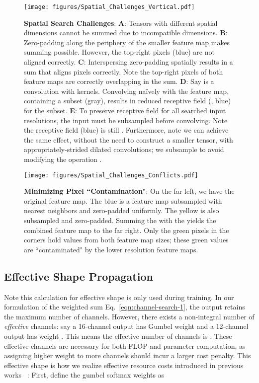 \documentclass[10pt,twocolumn,letterpaper]{article}
\begin{document}
\begin{figure}
    \centering
    \texttt{[image: figures/Spatial\_Challenges\_Vertical.pdf]}
    \caption{\textbf{Spatial Search Challenges}: \textbf{A}: Tensors with different spatial dimensions cannot be summed due to incompatible dimensions. \textbf{B}: Zero-padding along the periphery of the smaller feature map makes summing possible. However, the top-right pixels (blue) are not aligned correctly. \textbf{C}: Interspersing zero-padding spatially results in a sum that aligns pixels correctly. Note the top-right pixels of both feature maps are correctly overlapping in the sum. \textbf{D}: Say  is a convolution with  kernels. Convolving naïvely with the feature map, containing a subset (gray), results in reduced receptive field (, blue) for the subset. \textbf{E}: To preserve receptive field for all searched input resolutions, the input must be subsampled before convolving. Note the receptive field (blue) is still . Furthermore, note we can achieve the same effect, without the need to construct a smaller tensor, with appropriately-strided dilated convolutions; we subsample to avoid modifying the operation .}
    \label{fig:spatial_challenges}
\end{figure}

\begin{figure}
    \centering
    \texttt{[image: figures/Spatial\_Challenges\_Conflicts.pdf]}
    \caption{\textbf{Minimizing Pixel ``Contamination"}: On the far left, we have the original  feature map. The blue  is a feature map subsampled with nearest neighbors and zero-padded uniformly. The yellow  is also subsampled and zero-padded. Summing the  with the  yields the combined feature map to the far right. Only the green pixels in the corners hold values from both feature map sizes; these green values are ``contaminated" by the lower resolution feature maps.}
    \label{fig:spatial_challenges_conflicts}
\end{figure}

\subsection{Effective Shape Propagation}

Note this calculation for effective shape is only used during training. In our formulation of the weighted sum Eq.~\ref{eqn:channel-search-1}, the output  retains the maximum number of channels. However, there exists a non-integral number of \textit{effective} channels: say a 16-channel output has Gumbel weight  and a 12-channel output has weight . This means the effective number of channels is . These effective channels are necessary for both FLOP and parameter computation, as assigning higher weight to more channels should incur a larger cost penalty. This effective shape is how we realize effective resource costs introduced in previous works ~\cite{fbnet, snas}: First, define the gumbel softmax weights as
\end{document}

